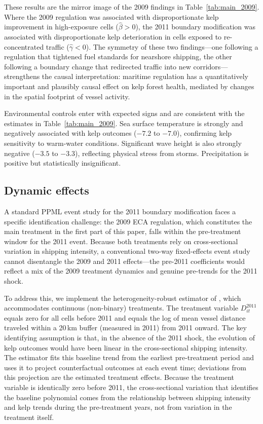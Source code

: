 \documentclass[12pt]{article}
\begin{document}
These results are the mirror image of the 2009 findings in Table~\ref{tab:main_2009}. Where the 2009 regulation was associated with disproportionate kelp improvement in high-exposure cells ($\hat{\beta}>0$), the 2011 boundary modification was associated with disproportionate kelp deterioration in cells exposed to re-concentrated traffic ($\hat{\gamma}<0$). The symmetry of these two findings---one following a regulation that tightened fuel standards for nearshore shipping, the other following a boundary change that redirected traffic into new corridors---strengthens the causal interpretation: maritime regulation has a quantitatively important and plausibly causal effect on kelp forest health, mediated by changes in the spatial footprint of vessel activity.

Environmental controls enter with expected signs and are consistent with the estimates in Table~\ref{tab:main_2009}. Sea surface temperature is strongly and negatively associated with kelp outcomes ($-7.2$ to $-7.0$), confirming kelp sensitivity to warm-water conditions. Significant wave height is also strongly negative ($-3.5$ to $-3.3$), reflecting physical stress from storms. Precipitation is positive but statistically insignificant.

\subsection{Dynamic effects}

A standard PPML event study for the 2011 boundary modification faces a specific identification challenge: the 2009 ECA regulation, which constitutes the main treatment in the first part of this paper, falls within the pre-treatment window for the 2011 event. Because both treatments rely on cross-sectional variation in shipping intensity, a conventional two-way fixed-effects event study cannot disentangle the 2009 and 2011 effects---the pre-2011 coefficients would reflect a mix of the 2009 treatment dynamics and genuine pre-trends for the 2011 shock.

To address this, we implement the heterogeneity-robust estimator of \citet{Chaisemartin2024}, which accommodates continuous (non-binary) treatments. The treatment variable $D_{it}^{2011}$ equals zero for all cells before 2011 and equals the log of mean vessel distance traveled within a 20\,km buffer (measured in 2011) from 2011 onward. The key identifying assumption is that, in the absence of the 2011 shock, the evolution of kelp outcomes would have been linear in the cross-sectional shipping intensity. The estimator fits this baseline trend from the earliest pre-treatment period and uses it to project counterfactual outcomes at each event time; deviations from this projection are the estimated treatment effects. Because the treatment variable is identically zero before 2011, the cross-sectional variation that identifies the baseline polynomial comes from the relationship between shipping intensity and kelp trends during the pre-treatment years, not from variation in the treatment itself.
\end{document}

